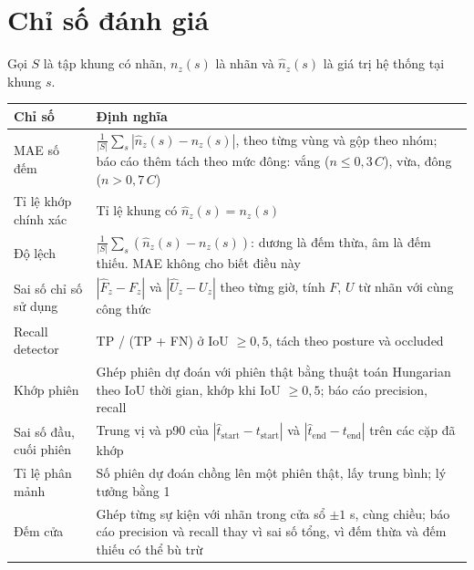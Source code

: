 \documentclass[10pt,a4paper,oneside,openany]{report}
\newcommand{\breakus}{\textunderscore\allowbreak}
\newcommand{\code}[1]{{\ttfamily\let\_\breakus #1}}
\newcommand{\tabhead}[1]{\textsf{\bfseries\color{ink}#1}}
\newenvironment{bang}{\par\small\rowcolors{2}{rowgray}{white}}{\par\vspace{0.3em}}
\begin{document}
\section{Chỉ số đánh giá}\label{sec:chiso}
Gọi $S$ là tập khung có nhãn, $n_z(s)$ là nhãn và $\hat n_z(s)$ là giá trị hệ thống tại khung $s$.
\begin{bang}
\begin{xltabular}{\linewidth}{L{36mm}Y}
\toprule
\tabhead{Chỉ số} & \tabhead{Định nghĩa} \\
\midrule
\endhead
MAE số đếm & $\frac{1}{|S|}\sum_{s}|\hat n_z(s) - n_z(s)|$, theo từng vùng và gộp theo nhóm; báo cáo thêm tách theo mức đông: vắng ($n \le 0{,}3\,C$), vừa, đông ($n > 0{,}7\,C$) \\
Tỉ lệ khớp chính xác & Tỉ lệ khung có $\hat n_z(s) = n_z(s)$ \\
Độ lệch & $\frac{1}{|S|}\sum_{s}(\hat n_z(s) - n_z(s))$: dương là đếm thừa, âm là đếm thiếu. MAE không cho biết điều này \\
Sai số chỉ số sử dụng & $|\hat F_z - F_z|$ và $|\hat U_z - U_z|$ theo từng giờ, tính $F$, $U$ từ nhãn với cùng công thức \\
Recall detector & TP / (TP + FN) ở IoU $\ge 0{,}5$, tách theo \code{posture} và \code{occluded} \\
Khớp phiên & Ghép phiên dự đoán với phiên thật bằng thuật toán Hungarian theo IoU thời gian, khớp khi IoU $\ge 0{,}5$; báo cáo precision, recall \\
Sai số đầu, cuối phiên & Trung vị và p90 của $|\hat t_{\text{start}} - t_{\text{start}}|$ và $|\hat t_{\text{end}} - t_{\text{end}}|$ trên các cặp đã khớp \\
Tỉ lệ phân mảnh & Số phiên dự đoán chồng lên một phiên thật, lấy trung bình; lý tưởng bằng 1 \\
Đếm cửa & Ghép từng sự kiện với nhãn trong cửa sổ $\pm 1$ s, cùng chiều; báo cáo precision và recall thay vì sai số tổng, vì đếm thừa và đếm thiếu có thể bù trừ \\
\bottomrule
\end{xltabular}
\end{bang}
\end{document}
